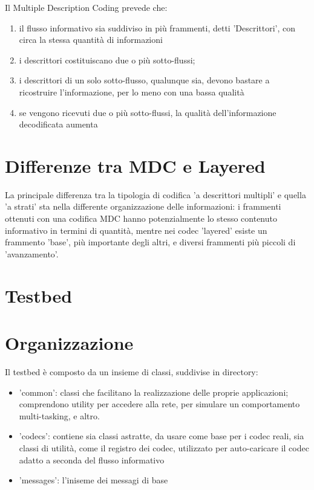 Il Multiple Description Coding prevede che:
\begin{enumerate}
\item il flusso informativo sia suddiviso in più frammenti, detti 'Descrittori', con circa la stessa quantità di informazioni
\item i descrittori costituiscano due o più sotto-flussi;
\item i descrittori di un solo sotto-flusso, qualunque sia, devono bastare a ricostruire l'informazione, per lo meno con una bassa qualità
\item se vengono ricevuti due o più sotto-flussi, la qualità dell'informazione decodificata aumenta 
\end{enumerate}





\section{Differenze tra MDC e Layered}


La principale differenza tra la tipologia di codifica 'a descrittori multipli' e quella 'a strati' sta nella differente organizzazione delle informazioni: i frammenti ottenuti con una codifica MDC hanno potenzialmente lo stesso contenuto informativo in termini di quantità, mentre nei codec 'layered' esiste un frammento 'base', più importante degli altri, e diversi frammenti più piccoli di 'avanzamento'.






\section{Testbed}



\section{Organizzazione}


Il testbed è composto da un insieme di classi, suddivise in directory:



\begin{itemize}
\item 'common': classi che facilitano la realizzazione delle proprie applicazioni; comprendono utility per accedere alla rete, per simulare un comportamento multi-tasking, e altro.

\item 'codecs': contiene sia classi astratte, da usare come base per i codec reali, sia classi di utilità, come il registro dei codec, utilizzato per auto-caricare il codec adatto a seconda del flusso informativo

\item 'messages': l'iniseme dei messagi di base
\end{itemize}




